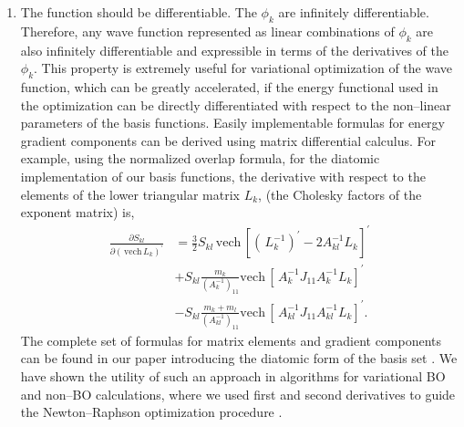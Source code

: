 \begin{enumerate}
\item  
The function should be differentiable.
The $\phi_k$ are infinitely 
differentiable. Therefore, any wave function 
represented as linear combinations 
of $\phi_k$ are also infinitely
differentiable and expressible in terms 
of the derivatives of the $\phi_k$.
This property is extremely useful for
variational optimization of the wave function,
which can be greatly accelerated, if 
the energy functional used in the optimization
can be directly differentiated with respect
to the non--linear parameters of the basis 
functions.
Easily implementable formulas for energy  gradient 
components can be derived
using matrix differential 
calculus\cite{Kinghorn95a}.
For example, using the normalized overlap formula, for the diatomic
implementation of our basis functions, the derivative with
respect to the elements of the lower triangular matrix $L_{k}$, 
(the Cholesky factors of the exponent matrix) is,
\begin{eqnarray}
\frac{\partial S_{kl}}{\partial\left(  \,\mathrm{vech}\,L_{k}\right)
^{\prime}}  &  =\frac{3}{2}S_{kl}\,\mathrm{vech}\,\left[  \left(  \,L_{k}%
^{-1}\right)  ^{\prime}-2A_{kl}^{-1}L_{k}\right]  ^{\prime}\nonumber\\
&  +S_{kl}\frac{m_{k}}{\left(  A_{k}^{-1}\right)  _{11}}\mathrm{vech}\,\left[
\,A_{k}^{-1}J_{11}A_{k}^{-1}L_{k}\right]  ^{\prime}\nonumber\\
&  -S_{kl}\frac{m_{k}+m_{l}}{\left(  A_{kl}^{-1}\right)  _{11}}\mathrm{vech}%
\,\left[  \,A_{kl}^{-1}J_{11}A_{kl}^{-1}L_{k}\right]  ^{\prime}.
\end{eqnarray}
The complete set of formulas for matrix elements and gradient
components can be
found in our paper introducing the diatomic form of the basis set 
\cite{kinghorn99a}.
We have shown the utility of such an approach
in algorithms for variational BO and non--BO calculations,
where we used first and second derivatives to guide
the Newton--Raphson optimization procedure
\cite{A8,A14,A21,A38,kozlowski92b}. 


\end{enumerate}
